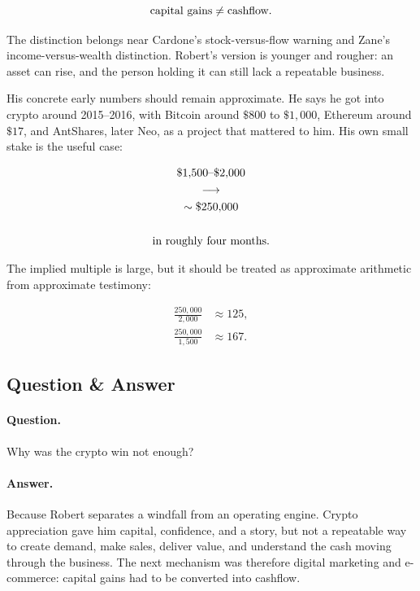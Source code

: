 \documentclass[11pt,oneside]{book}
\begin{document}
\begin{equation}
\hbox{capital gains}\neq \hbox{cashflow}.
\end{equation}

The distinction belongs near Cardone's stock-versus-flow warning and Zane's income-versus-wealth distinction. Robert's version is younger and rougher: an asset can rise, and the person holding it can still lack a repeatable business.

His concrete early numbers should remain approximate. He says he got into crypto around 2015--2016, with Bitcoin around \(\$800\) to \(\$1{,}000\), Ethereum around \(\$17\), and AntShares, later Neo, as a project that mattered to him. His own small stake is the useful case:

\begin{equation}
\begin{gathered}
\$1{,}500\hbox{--}\$2{,}000\\
\longrightarrow\\
\sim \$250{,}000\\
\quad\\
\hbox{in roughly four months.}
\end{gathered}
\end{equation}

The implied multiple is large, but it should be treated as approximate arithmetic from approximate testimony:

\begin{align}
\frac{250{,}000}{2{,}000} &\approx 125,\\
\frac{250{,}000}{1{,}500} &\approx 167.
\end{align}

\subsection{Question \& Answer}

\paragraph{Question.}
Why was the crypto win not enough?

\paragraph{Answer.}
Because Robert separates a windfall from an operating engine. Crypto appreciation gave him capital, confidence, and a story, but not a repeatable way to create demand, make sales, deliver value, and understand the cash moving through the business. The next mechanism was therefore digital marketing and e-commerce: capital gains had to be converted into cashflow.
\end{document}
